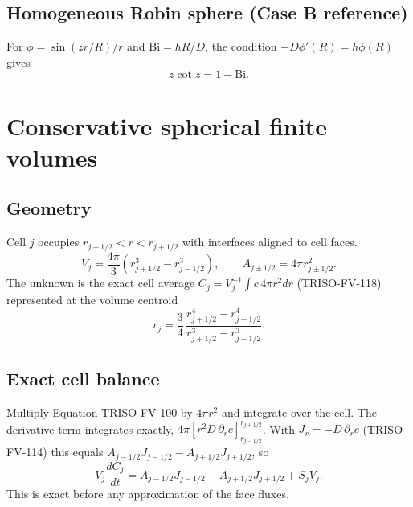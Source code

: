\documentclass[11pt]{article}
\begin{document}
\subsection{Homogeneous Robin sphere (Case B reference)}\label{sec:robin}
For $\phi=\sin(zr/R)/r$ and $\mathrm{Bi}=hR/D$, the condition $-D\phi'(R)=h\phi(R)$ gives
\[
z\cot z=1-\mathrm{Bi}.
\]

\section{Conservative spherical finite volumes}
\subsection{Geometry}
Cell $j$ occupies $r_{j-1/2}<r<r_{j+1/2}$ with interfaces aligned to cell faces.
\begin{equation}
V_j=\frac{4\pi}{3}\left(r_{j+1/2}^3-r_{j-1/2}^3\right),\qquad A_{j\pm1/2}=4\pi r_{j\pm1/2}^2.
\tag{TRISO-FV-101}
\end{equation}
The unknown is the exact cell average $C_j=V_j^{-1}\int c\,4\pi r^2dr$ (TRISO-FV-118) represented at the volume centroid
\begin{equation}
r_j=\frac{3}{4}\,\frac{r_{j+1/2}^4-r_{j-1/2}^4}{r_{j+1/2}^3-r_{j-1/2}^3}.
\tag{TRISO-FV-109A}
\end{equation}

\subsection{Exact cell balance}
Multiply Equation TRISO-FV-100 by $4\pi r^2$ and integrate over the cell. The derivative term integrates exactly, $4\pi\left[r^2D\,\partial_rc\right]_{r_{j-1/2}}^{r_{j+1/2}}$. With $J_r=-D\,\partial_rc$ (TRISO-FV-114) this equals $A_{j-1/2}J_{j-1/2}-A_{j+1/2}J_{j+1/2}$, so
\begin{equation}
V_j\frac{dC_j}{dt}=A_{j-1/2}J_{j-1/2}-A_{j+1/2}J_{j+1/2}+S_jV_j.
\tag{TRISO-FV-123}
\end{equation}
This is exact before any approximation of the face fluxes.
\end{document}
